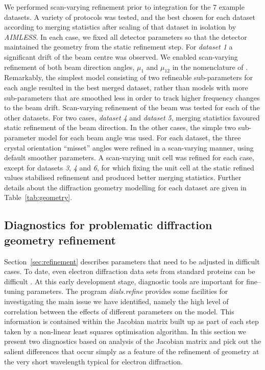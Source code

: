 \documentclass[preprint]{iucr}
\newcommand{\dialsrefine}{\emph{dials.refine}\xspace}
\newcommand{\aimless}{\emph{AIMLESS}\xspace}
\begin{document}
We performed scan-varying refinement prior to integration for the 7 example
datasets. A variety of protocols was tested, and the best chosen for each
dataset according to merging statistics after scaling of that dataset in
isolation by \aimless \cite{Evans2013}. In each case, we fixed all detector
parameters so that the detector maintained the geometry from the static
refinement step. For \emph{dataset 1} a significant drift of the beam centre
was observed. We enabled scan-varying refinement of both beam direction angles,
$\mu_1$ and $\mu_12$ in the nomenclature of .
Remarkably, the simplest model consisting of two refineable sub-parameters for
each angle resulted in the best merged dataset, rather than models with more
sub-parameters that are smoothed less in order to track higher frequency
changes to the beam drift. Scan-varying refinement of the beam was tested for
each of the other datasets. For two cases, \emph{dataset 4} and
\emph{dataset 5}, merging statistics favoured static refinement of the beam
direction. In the other cases, the simple two sub-parameter model for each
beam angle was used. For each dataset, the three crystal orientation ``misset''
angles were refined in a scan-varying manner, using default smoother parameters.
A scan-varying unit cell was refined for each case, except for datasets
\emph{3}, \emph{4} and \emph{6}, for which fixing the unit cell at the static
refined values stabilised refinement and produced better merging statistics.
Further details about the diffraction geometry modelling for each dataset
are given in Table~\ref{tab:geometry}.


\subsection{Diagnostics for problematic diffraction geometry refinement
\label{sec:diag}}

Section~\ref{sec:refinement} describes parameters that need to be adjusted in
difficult cases. To date, even electron diffraction data sets from standard
proteins can be difficult \cite{Clabbers2017,Hattne2015}. At this early
development stage, diagnostic tools are important for fine--tuning parameters.
The program \dialsrefine provides some facilities for investigating the main
issue we have identified, namely the high level of correlation between the
effects of different parameters on the model. This information is contained
within the Jacobian matrix built up as part of each step taken by a non-linear
least squares optimisation algorithm. In this section we present two
diagnostics based on analysis of the Jacobian matrix and pick out the salient
differences that occur simply as a feature of the refinement of geometry at the
very short wavelength typical for electron diffraction.
\end{document}
